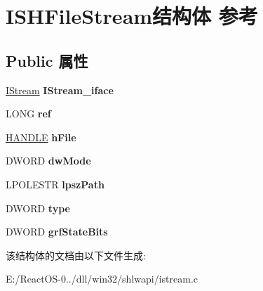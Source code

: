 \hypertarget{struct_i_s_h_file_stream}{}\section{I\+S\+H\+File\+Stream结构体 参考}
\label{struct_i_s_h_file_stream}
\subsection*{Public 属性}
\begin{DoxyCompactItemize}
\item 
\mbox{\label{struct_i_s_h_file_stream_aef82b010c72c08d3450a579d5be09fab}} 
\hyperlink{interface_i_stream}{I\+Stream} {\bfseries I\+Stream\+\_\+iface}
\item 
\mbox{\label{struct_i_s_h_file_stream_ab837d5a345f7ec81e840463b21ee4296}} 
L\+O\+NG {\bfseries ref}
\item 
\mbox{\label{struct_i_s_h_file_stream_a7962ff55923eff8cccc5b32bcf4ddbf4}} 
\hyperlink{interfacevoid}{H\+A\+N\+D\+LE} {\bfseries h\+File}
\item 
\mbox{\label{struct_i_s_h_file_stream_aed473300940db687a3d6cc4a0fce39fb}} 
D\+W\+O\+RD {\bfseries dw\+Mode}
\item 
\mbox{\label{struct_i_s_h_file_stream_a84b0ca111e3a7f039d5e21d538f4d5d4}} 
L\+P\+O\+L\+E\+S\+TR {\bfseries lpsz\+Path}
\item 
\mbox{\label{struct_i_s_h_file_stream_a07d3a958580875c9cf373e809f192761}} 
D\+W\+O\+RD {\bfseries type}
\item 
\mbox{\label{struct_i_s_h_file_stream_a4f95a434f8a5f41e5d70fc73682d128a}} 
D\+W\+O\+RD {\bfseries grf\+State\+Bits}
\end{DoxyCompactItemize}


该结构体的文档由以下文件生成\+:\begin{DoxyCompactItemize}
\item 
E\+:/\+React\+O\+S-\/0../dll/win32/shlwapi/istream.\+c\end{DoxyCompactItemize}
